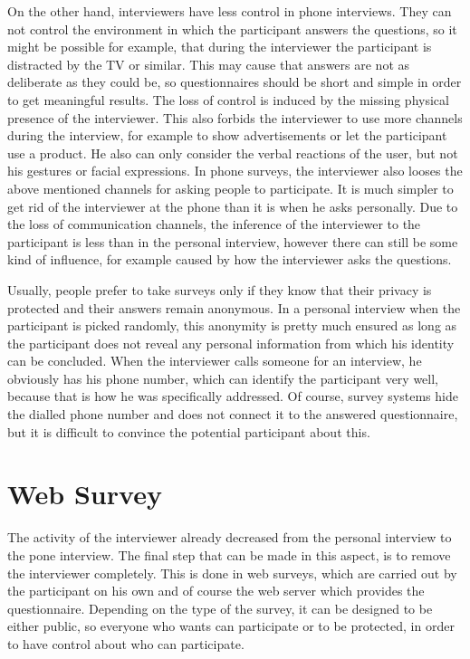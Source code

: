 \documentclass{report}
\begin{document}
On the other hand, interviewers have less control in phone interviews. They can not control the environment in which the participant answers the questions, so it might be possible for example, that during the interviewer the participant is distracted by the TV or similar. This may cause that answers are not as deliberate as they could be, so questionnaires should be short and simple in order to get meaningful results. The loss of control is induced by the missing physical presence of the interviewer. This also forbids the interviewer to use more channels during the interview, for example to show advertisements or let the participant use a product. He also can only consider the verbal reactions of the user, but not his gestures or facial expressions. In phone surveys, the interviewer also looses the above mentioned channels for asking people to participate. It is much simpler to get rid of the interviewer at the phone than it is when he asks personally. Due to the loss of communication channels, the inference of the interviewer to the participant is less than in the personal interview, however there can still be some kind of influence, for example caused by how the interviewer asks the questions.

Usually, people prefer to take surveys only if they know that their privacy is protected and their answers remain anonymous. In a personal interview when the participant is picked randomly, this anonymity is pretty much ensured as long as the participant does not reveal any personal information from which his identity can be concluded. When the interviewer calls someone for an interview, he obviously has his phone number, which can identify the participant very well, because that is how he was specifically addressed. Of course, survey systems hide the dialled phone number and does not connect it to the answered questionnaire, but it is difficult to convince the potential participant about this.

\section{Web Survey}

The activity of the interviewer already decreased from the personal interview to the pone interview. The final step that can be made in this aspect, is to remove the interviewer completely. This is done in web surveys, which are carried out by the participant on his own and of course the web server which provides the questionnaire. Depending on the type of the survey, it can be designed to be either public, so everyone who wants can participate or to be protected, in order to have control about who can participate.
\end{document}

